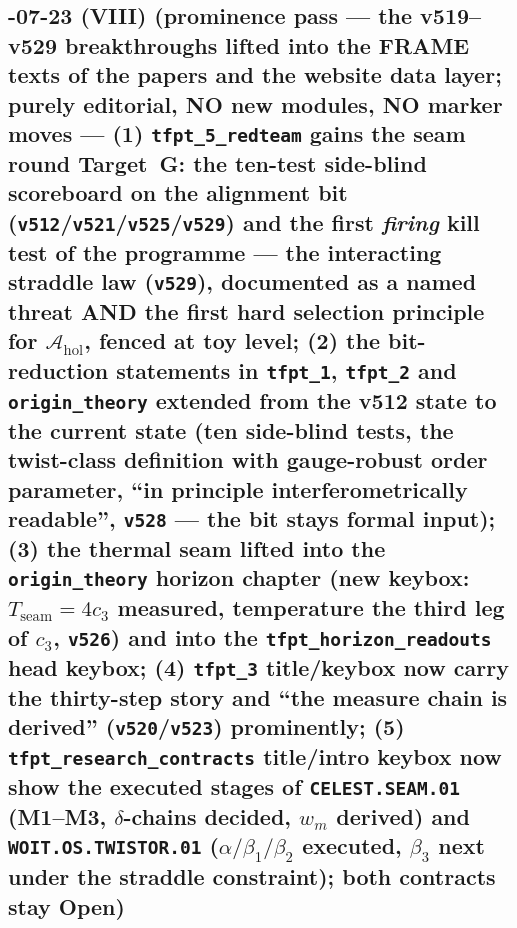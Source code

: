 \documentclass[11pt]{article}
\providecommand{\vref}[1]{\texttt{#1}}
\begin{document}
\subsection*{-07-23 (VIII) (prominence pass --- the v519--v529 breakthroughs lifted into the FRAME texts of the papers and the website data layer; purely editorial, NO new modules, NO marker moves --- (1) \texttt{tfpt\_5\_redteam} gains the seam round Target~G: the ten-test side-blind scoreboard on the alignment bit (\vref{v512}/\vref{v521}/\vref{v525}/\vref{v529}) and the first \emph{firing} kill test of the programme --- the interacting straddle law (\vref{v529}), documented as a named threat AND the first hard selection principle for $\mathcal A_{\mathrm{hol}}$, fenced at toy level; (2) the bit-reduction statements in \texttt{tfpt\_1}, \texttt{tfpt\_2} and \texttt{origin\_theory} extended from the v512 state to the current state (ten side-blind tests, the twist-class definition with gauge-robust order parameter, ``in principle interferometrically readable'', \vref{v528} --- the bit stays formal input); (3) the thermal seam lifted into the \texttt{origin\_theory} horizon chapter (new keybox: $T_{\mathrm{seam}}=4c_3$ measured, temperature the third leg of $c_3$, \vref{v526}) and into the \texttt{tfpt\_horizon\_readouts} head keybox; (4) \texttt{tfpt\_3} title/keybox now carry the thirty-step story and ``the measure chain is derived'' (\vref{v520}/\vref{v523}) prominently; (5) \texttt{tfpt\_research\_contracts} title/intro keybox now show the executed stages of \texttt{CELEST.SEAM.01} (M1--M3, $\delta$-chains decided, $w_m$ derived) and \texttt{WOIT.OS.TWISTOR.01} ($\alpha/\beta_1/\beta_2$ executed, $\beta_3$ next under the straddle constraint); both contracts stay Open)}
\end{document}
